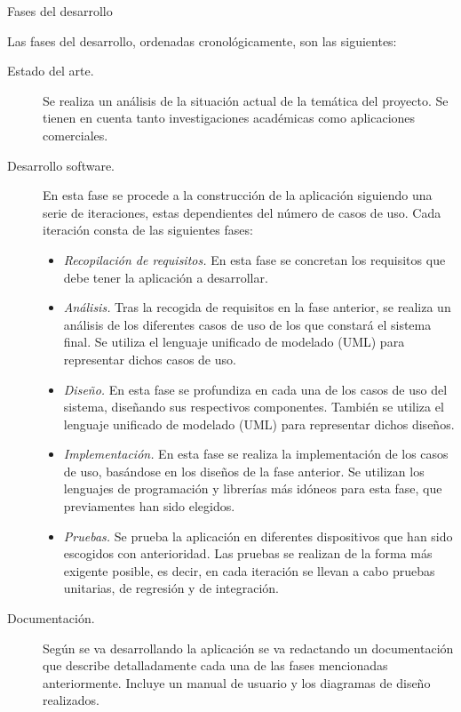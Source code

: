 \documentclass[12pt,a4paper,spanish,oneside]{report}
\makeatletter
\renewcommand{\subsection}{
  \@startsection{subsection}{2}{0mm}{2mm}
  {4.0mm}{\Large\bf}
}
\theoremstyle{plain} \newtheorem{nota}{Nota}
\makeatother
\begin{document}
\subsection{Fases del desarrollo}
\begin{spacing}{1.5}
Las fases del desarrollo, ordenadas cronológicamente, son las siguientes:
\begin{description}
\item [Estado del arte.] Se realiza un análisis de la situación actual de la 
temática del proyecto. Se tienen en cuenta tanto investigaciones académicas 
como aplicaciones comerciales.
\item [Desarrollo software.] En esta fase se procede a la construcción de la 
aplicación siguiendo una serie de iteraciones, estas dependientes del número de
casos de uso. Cada iteración consta de las siguientes fases:
\begin{itemize}
\item \emph{Recopilación de requisitos.} En esta fase se concretan los 
requisitos que debe tener la aplicación a desarrollar.
\item \emph{Análisis.} Tras la recogida de requisitos en la fase anterior, se
realiza un análisis de los diferentes casos de uso de los que constará el 
sistema final. Se utiliza el lenguaje unificado de modelado (UML) para 
representar dichos casos de uso.
\item \emph{Diseño.} En esta fase se profundiza en cada una de los casos de uso
del sistema, diseñando sus respectivos componentes. También se utiliza el 
lenguaje unificado de modelado (UML) para representar dichos diseños.
\item \emph{Implementación.} En esta fase se realiza la implementación de los 
casos de uso, basándose en los diseños de la fase anterior. Se utilizan los 
lenguajes de programación y librerías más idóneos para esta fase, que 
previamentes han sido elegidos.
\item \emph{Pruebas.} Se prueba la aplicación en diferentes dispositivos que 
han sido escogidos con anterioridad. Las pruebas se realizan de la forma más 
exigente posible, es decir, en cada iteración se llevan a cabo pruebas 
unitarias, de regresión y de integración.
\end{itemize}
\item[Documentación.] Según se va desarrollando la aplicación se va redactando
un documentación que describe detalladamente cada una de las fases mencionadas
anteriormente. Incluye un manual de usuario y los diagramas de diseño 
realizados.
\end{description}
\end{spacing}
\end{document}

